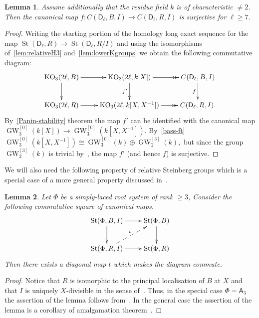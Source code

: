 \documentclass[oneside, 8pt]{amsart}
\newtheorem{lemma}{Lemma}
\theoremstyle{remark}
\theoremstyle{definition}
\numberwithin{lemma}{section}
\numberwithin{prop}{section}
\numberwithin{corollary}{section}
\numberwithin{externaltheorem}{section}
\DeclareMathOperator{\St}{St}
\DeclareMathOperator{\K}{K}
\DeclareMathOperator{\KO}{KO}
\DeclareMathOperator{\GW}{GW}
\newcommand{\rA}{\mathsf{A}}
\newcommand{\rD}{\mathsf{D}}
\numberwithin{equation}{section}
\begin{document}
\begin{lemma} \label{lem:prop41}
Assume additionally that the residue field $k$ is of characteristic $\neq 2$.
Then the canonical map $f\colon C(\rD_\ell, B, I) \to C(\rD_\ell, R, I)$ is surjective for $\ell \geq 7$. \end{lemma}
\begin{proof}
Writing the starting portion of the homology long exact sequence for the map $\St(\rD_\ell, R) \to \St(\rD_\ell, R/I)$ 
and using the isomorphisms of~\cref{lem:relativeH3} and~\cref{lem:lowerKgroups} we obtain the following commutative diagram:
\begin{equation*}\xymatrix{
 \KO_3(2\ell, B) \ar[r] \ar[d] & \KO_3(2\ell, k[X]) \ar[d]_{f'} \ar@{->>}[r] & \ar[d]_{f} C(\rD_\ell, B, I) \\
 \KO_3(2\ell, R) \ar[r]        & \KO_3(2\ell, k[X, X^{-1}]) \ar@{->>}[r]        & C(\rD_\ell, R, I).}\end{equation*}
By~\cref{Panin-stability} theorem the map $f'$ can be identified with the canonical map $\GW_3^{[0]}(k[X]) \to \GW_3^{[0]}(k[X, X^{-1}])$.
By~\cref{bass-ft} $\GW_3^{[0]}(k[X, X^{-1}]) \cong \GW_3^{[0]}(k) \oplus \GW_2^{[3]}(k),$
but since the group $\GW_2^{[3]}(k)$ is trivial by~\cite[Lemma~2.2]{FRS12}, the map $f'$ (and hence $f$) is surjective.
\end{proof} 
 
We will also need the following property of relative Steinberg groups which is a special case of a more general property discussed in~\cite[\S~2]{LS17}.
\begin{lemma}\label{lem:lemma32} Let $\Phi$ be a simply-laced root system of rank $\geq 3$,
Consider the following commutative square of canonical maps.
\[ \xymatrix{
    \St(\Phi, B, I) \ar[r] \ar[d] & \St(\Phi, B) \ar[d] \\
    \St(\Phi, R, I) \ar[r] \ar@{-->}^t[ur] & \St(\Phi, R) } \]
Then there exists a diagonal map $t$ which makes the diagram commute.   
\end{lemma} 
\begin{proof}
 Notice that $R$ is isomorphic to the principal localisation of $B$ at $X$
  and that $I$ is uniquely $X$-divisible in the sense of~\cite[\S~4]{LS17}.
 Thus, in the special case $\Phi = \rA_3$ the assertion of the lemma follows from~\cite[Theorem~3]{LS17}.
 In the general case the assertion of the lemma is a corollary of amalgamation theorem~\cite[Theorem~9]{S15}.
\end{proof}
\end{document}
